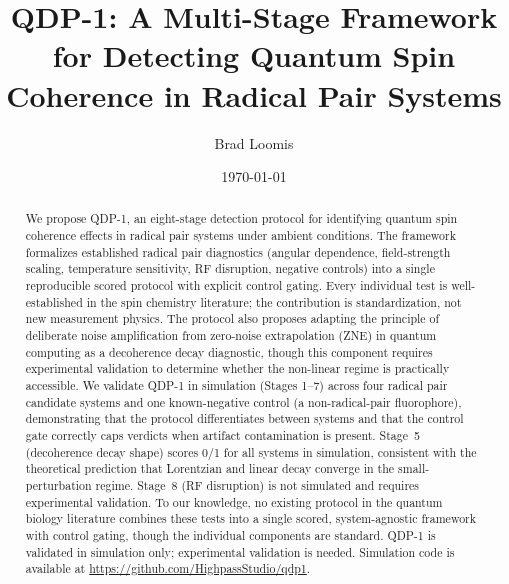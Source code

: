 \documentclass[preprint,amsmath,amssymb]{revtex4-2}
\begin{document}
\title{QDP-1: A Multi-Stage Framework for Detecting Quantum Spin Coherence in Radical Pair Systems}

\author{Brad Loomis}

\date{\today}

\begin{abstract}
We propose QDP-1, an eight-stage detection protocol for identifying quantum spin coherence effects in radical pair systems under ambient conditions. The framework formalizes established radical pair diagnostics (angular dependence, field-strength scaling, temperature sensitivity, RF disruption, negative controls) into a single reproducible scored protocol with explicit control gating. Every individual test is well-established in the spin chemistry literature; the contribution is standardization, not new measurement physics. The protocol also proposes adapting the principle of deliberate noise amplification from zero-noise extrapolation (ZNE) in quantum computing as a decoherence decay diagnostic, though this component requires experimental validation to determine whether the non-linear regime is practically accessible. We validate QDP-1 in simulation (Stages 1--7) across four radical pair candidate systems and one known-negative control (a non-radical-pair fluorophore), demonstrating that the protocol differentiates between systems and that the control gate correctly caps verdicts when artifact contamination is present. Stage~5 (decoherence decay shape) scores 0/1 for all systems in simulation, consistent with the theoretical prediction that Lorentzian and linear decay converge in the small-perturbation regime. Stage~8 (RF disruption) is not simulated and requires experimental validation. To our knowledge, no existing protocol in the quantum biology literature combines these tests into a single scored, system-agnostic framework with control gating, though the individual components are standard. QDP-1 is validated in simulation only; experimental validation is needed. Simulation code is available at \url{https://github.com/HighpassStudio/qdp1}.
\end{abstract}


\maketitle
\end{document}
